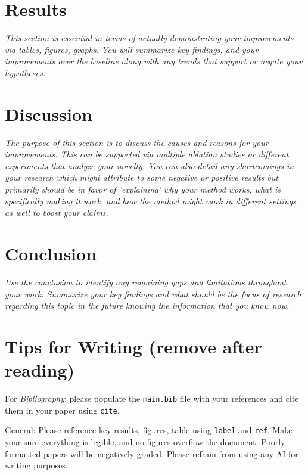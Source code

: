 \documentclass{article}
\begin{document}
\section{Results}
\textit{This section is essential in terms of actually demonstrating your improvements via tables, figures, graphs. You will summarize key findings, and your improvements over the baseline along with any trends that support or negate your hypotheses. }

\section{Discussion}
\textit{The purpose of this section is to discuss the causes and reasons for your improvements. This can be supported via multiple ablation studies or different experiments that analyze your novelty. You can also detail any shortcomings in your research which might attribute to some negative or positive results but primarily should be in favor of 'explaining' why your method works, what is specifically making it work, and how the method might work in different settings as well to boost your claims.}

\section{Conclusion}
\textit{Use the conclusion to identify any remaining gaps and limitations throughout your work. Summarize your key findings and what should be the focus of research regarding this topic in the future knowing the information that you know now.}

\section{Tips for Writing (remove after reading)}
For \textit{Bibliography}: please populate the \texttt{main.bib} file with your references and cite them in your paper using \texttt{cite}.

General: Please reference key results, figures, table using \texttt{label} and \texttt{ref}. Make your sure everything is legible, and no figures overflow the document. Poorly formatted papers will be negatively graded. Please refrain from using any AI for writing purposes.



\end{document}
